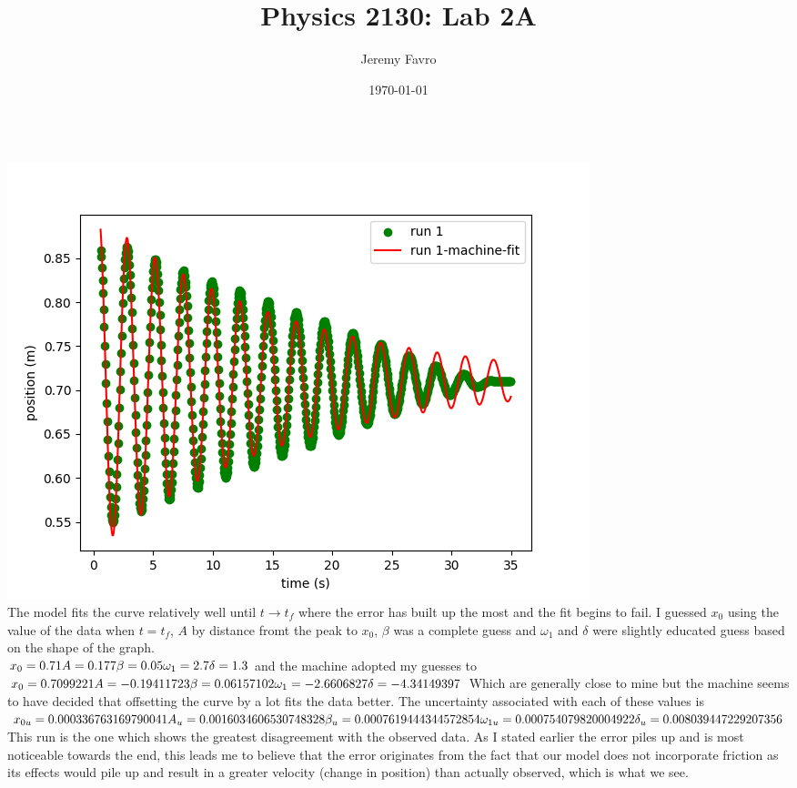 \documentclass[10pt]{article}
\title{Physics 2130: Lab 2A}
\author{Jeremy Favro}
\date{\today}
\theoremstyle{definition}
\begin{document}
\maketitle

\inputminted{python}{lab2a.py}
\newpage
\includegraphics{Figure_0.png}\\
The model fits the curve relatively well until $t\to t_f$ where the error has built up the most and the fit begins to fail.
I guessed $x_0$ using the value of the data when $t=t_f$, $A$ by distance fromt the peak to $x_0$, $\beta$ was a complete guess
and $\omega_1$ and $\delta$ were slightly educated guess based on the shape of the graph. \\
$
x_0 = 0.71 \\
A = 0.177 \\
\beta = 0.05 \\
\omega_1 = 2.7 \\
\delta = 1.3 \\
$
and the machine adopted my guesses to \\
$
x_0 = 0.7099221 \\
A = -0.19411723 \\
\beta = 0.06157102 \\
\omega_1 = -2.6606827 \\
\delta = -4.34149397 \\
$
Which are generally close to mine but the machine seems to have decided that offsetting the curve by a lot fits
the data better. The uncertainty associated with each of these values is \\
$
x_{0u} = 0.000336763169790041 \\
A_u = 0.0016034606530748328 \\
\beta_u = 0.0007619444344572854 \\
\omega_{1u} = 0.000754079820004922 \\
\delta_u = 0.008039447229207356 \\
$
This run is the one which shows the greatest disagreement with the observed data. As I stated earlier the error piles up and
is most noticeable towards the end, this leads me to believe that the error originates from the fact that our model
does not incorporate friction as its effects would pile up and result in a greater velocity (change in position) than actually observed, which is 
what we see.
\end{document}
